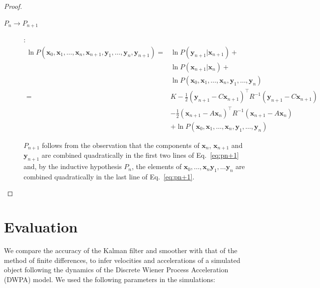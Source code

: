 \documentclass[12pt]{article}
\begin{document}
\begin{proof}
\begin{description}
        \item[$P_n\rightarrow P_{n+1}$]:
            \begin{align}
                \ln P(\mathbf{x}_0, \mathbf{x}_1, \ldots, \mathbf{x}_n, \mathbf{x}_{n+1},\mathbf{y}_1, \ldots, \mathbf{y}_{n}, \mathbf{y}_{n+1})=&\ln P(\mathbf{y}_{n+1}|\mathbf{x}_{n+1})+\nonumber\\
                &\ln P(\mathbf{x}_{n+1}|\mathbf{x}_n)+\nonumber\\
                &\ln P(\mathbf{x}_0,\mathbf{x}_1,\ldots,\mathbf{x}_n,\mathbf{y}_1, \ldots, \mathbf{y}_{n})\nonumber\\
                =&K-\frac{1}{2}(\mathbf{y}_{n+1}-C\mathbf{x}_{n+1})^\intercal R^{-1}(\mathbf{y}_{n+1}-C\mathbf{x}_{n+1})\nonumber\\
                 &-\frac{1}{2}(\mathbf{x}_{n+1}-A\mathbf{x}_{n})^\intercal R^{-1}(\mathbf{x}_{n+1}-A\mathbf{x}_{n})\nonumber\\
                 &+\ln P(\mathbf{x}_0,\mathbf{x}_1,\ldots,\mathbf{x}_n,\mathbf{y}_1, \ldots, \mathbf{y}_{n})\label{eq:pn+1}
            \end{align}

            $P_{n+1}$ follows from the observation that the components of
            $\mathbf{x}_n$, $\mathbf{x}_{n+1}$ and $\mathbf{y}_{n+1}$ are combined
            quadratically in the first two lines of Eq.~\ref{eq:pn+1} and, by
            the inductive hypothesis $P_n$, the elements of
            $\mathbf{x}_0,\ldots,\mathbf{x}_n\mathbf{y}_1,\ldots\mathbf{y}_n$
            are combined quadratically in the last line of Eq.~\ref{eq:pn+1}.

    \end{description}

\end{proof}

\section{Evaluation}

We compare the accuracy of the Kalman filter and smoother with that of the
method of finite differences, to infer velocities and accelerations of a
simulated object following the dynamics of the Discrete Wiener Process
Acceleration (DWPA) model.  We used the following parameters in the
simulations:
\end{document}

